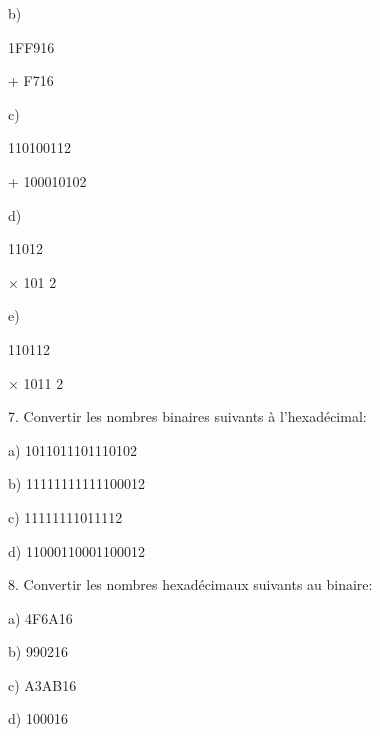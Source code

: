 \documentclass[a4paper,portrait,12pt]{article}
\begin{document}
\begin{flushleft}
b)
\end{flushleft}


\begin{flushleft}
1FF916
\end{flushleft}


\begin{flushleft}
+ F716
\end{flushleft}


\begin{flushleft}
c)
\end{flushleft}


110100112


+ 100010102


\begin{flushleft}
d)
\end{flushleft}


11012


× 101 2


\begin{flushleft}
e)
\end{flushleft}


110112


× 1011 2


\begin{flushleft}
7. Convertir les nombres binaires suivants \`{a} l'hexad\'{e}cimal:
\end{flushleft}


\begin{flushleft}
a) 1011011101110102
\end{flushleft}


\begin{flushleft}
b) 11111111111100012
\end{flushleft}


\begin{flushleft}
c) 11111111011112
\end{flushleft}


\begin{flushleft}
d) 11000110001100012
\end{flushleft}


\begin{flushleft}
8. Convertir les nombres hexad\'{e}cimaux suivants au binaire:
\end{flushleft}


\begin{flushleft}
a) 4F6A16
\end{flushleft}


\begin{flushleft}
b) 990216
\end{flushleft}


\begin{flushleft}
c) A3AB16
\end{flushleft}


\begin{flushleft}
d) 100016
\end{flushleft}





\newpage
\end{document}
